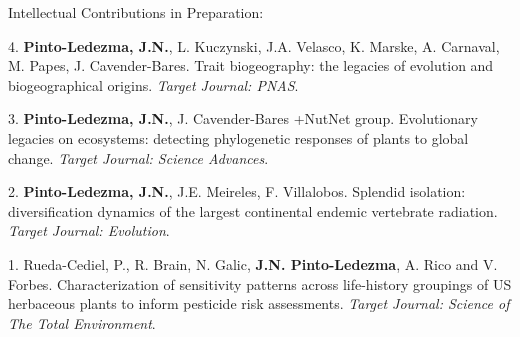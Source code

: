 \documentclass{resume} %
\begin{document}

\begin{rSection}{Intellectual Contributions in Preparation:}

{4.} {\bf{Pinto-Ledezma, J.N.}}, {L. Kuczynski, J.A. Velasco, K. Marske, A. Carnaval, M. Papes, J. Cavender-Bares. Trait biogeography: the legacies of evolution and biogeographical origins.} {\em Target Journal: PNAS}.  

{3.} {\bf{Pinto-Ledezma, J.N.}}, {J. Cavender-Bares +NutNet group. Evolutionary legacies on ecosystems: detecting phylogenetic responses of plants to global change.} {\em Target Journal: Science Advances}.  

{2.} {\bf{Pinto-Ledezma, J.N.}}, {J.E. Meireles, F. Villalobos. Splendid isolation: diversification dynamics of the largest continental endemic vertebrate radiation.} {\em Target Journal: Evolution}. 

{1.} {Rueda-Cediel, P., R. Brain, N. Galic, {\bf J.N. Pinto-Ledezma}, A. Rico and V. Forbes. Characterization of sensitivity patterns across life-history groupings of US herbaceous plants to inform pesticide risk assessments.} {\em Target Journal: Science of The Total Environment}. 
\end{rSection}


\end{document}
